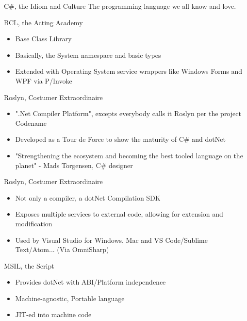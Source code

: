 \documentclass[10pt]{beamer}
\begin{document}
\begin{frame}{C\#, the Idiom and Culture}
    The programming language we all know and love.
\end{frame}

\begin{frame}{BCL, the Acting Academy}
    \begin{itemize} 
        \item Base Class Library
        \item Basically, the System namespace and basic types
        \item Extended with Operating System service wrappers like Windows Forms and WPF via P/Invoke
    \end{itemize}
\end{frame}

\begin{frame}{Roslyn, Costumer Extraordinaire}
    \begin{itemize}
        \item ".Net Compiler Platform", excepts everybody calls it Roslyn per the project Codename
        \item Developed as a Tour de Force to show the maturity of C\# and dotNet
        \item "Strengthening the ecosystem and becoming the best tooled language on the planet" - Mads Torgensen, C\# designer
    \end{itemize}
\end{frame}

\begin{frame}{Roslyn, Costumer Extraordinaire}
    \begin{itemize}
        \item Not only a compiler, a dotNet Compilation SDK
        \item Exposes multiple services to external code, allowing for extension and modification
        \item Used by Visual Studio for Windows, Mac and VS Code/Sublime Text/Atom... (Via OmniSharp)
    \end{itemize}
\end{frame}

\begin{frame}{MSIL, the Script}
    \begin{itemize}
        \item Provides dotNet with ABI/Platform independence
        \item Machine-agnostic, Portable language
        \item JIT-ed into machine code
    \end{itemize}
\end{frame}
\end{document}

